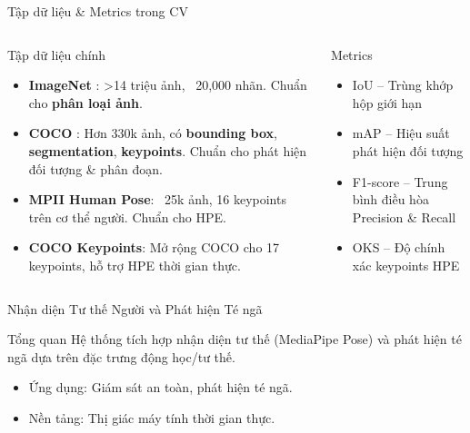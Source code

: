 \begin{frame}{Tập dữ liệu \& Metrics trong CV}
\begin{columns}[T]

\begin{column}{0.55\textwidth}
\begin{block}{Tập dữ liệu chính}
\begin{itemize}
    \item \textbf{ImageNet} \cite{deng2009imagenet}: >14 triệu ảnh, ~20,000 nhãn. Chuẩn cho \textbf{phân loại ảnh}.
    \item \textbf{COCO} \cite{lin2014microsoft}: Hơn 330k ảnh, có \textbf{bounding box}, \textbf{segmentation}, \textbf{keypoints}. Chuẩn cho phát hiện đối tượng & phân đoạn.
    \item \textbf{MPII Human Pose}: ~25k ảnh, 16 keypoints trên cơ thể người. Chuẩn cho HPE.
    \item \textbf{COCO Keypoints}: Mở rộng COCO cho 17 keypoints, hỗ trợ HPE thời gian thực.
\end{itemize}
\end{block}
\end{column}

\begin{column}{0.45\textwidth}
\begin{block}{Metrics}
\begin{itemize}
    \item IoU – Trùng khớp hộp giới hạn
    \item mAP – Hiệu suất phát hiện đối tượng
    \item F1-score – Trung bình điều hòa Precision & Recall
    \item OKS – Độ chính xác keypoints HPE
\end{itemize}
\end{block}
\end{column}

\end{columns}
\end{frame}


\begin{frame}{Nhận diện Tư thế Người và Phát hiện Té ngã}
    \begin{block}{Tổng quan}
        Hệ thống tích hợp nhận diện tư thế (MediaPipe Pose) và phát hiện té ngã dựa trên đặc trưng động học/tư thế.
        \begin{itemize}
            \item Ứng dụng: Giám sát an toàn, phát hiện té ngã.
            \item Nền tảng: Thị giác máy tính thời gian thực.
        \end{itemize}
    \end{block}
\end{frame}

